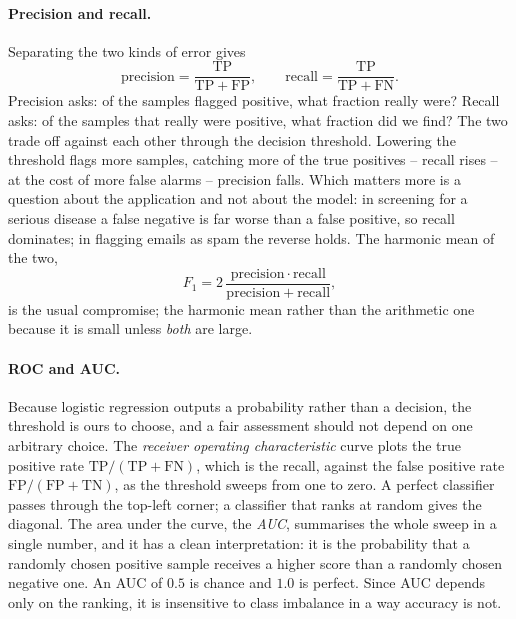 \paragraph{Precision and recall.}
Separating the two kinds of error gives
\begin{equation}
  \mathrm{precision} = \frac{\mathrm{TP}}{\mathrm{TP}+\mathrm{FP}},
  \qquad
  \mathrm{recall} = \frac{\mathrm{TP}}{\mathrm{TP}+\mathrm{FN}} .
  \label{eq:5-precisionrecall}
\end{equation}
Precision asks: of the samples flagged positive, what fraction really were?
Recall asks: of the samples that really were positive, what fraction did we
find?  The two trade off against each other through the decision threshold.
Lowering the threshold flags more samples, catching more of the true positives
-- recall rises -- at the cost of more false alarms -- precision falls.  Which
matters more is a question about the application and not about the model: in
screening for a serious disease a false negative is far worse than a false
positive, so recall dominates; in flagging emails as spam the reverse holds.
The harmonic mean of the two,
\begin{equation}
  F_1 = 2\,\frac{\mathrm{precision}\cdot\mathrm{recall}}
                {\mathrm{precision}+\mathrm{recall}},
  \label{eq:5-f1}
\end{equation}
is the usual compromise; the harmonic mean rather than the arithmetic one
because it is small unless \emph{both} are large.

\paragraph{ROC and AUC.}
Because logistic regression outputs a probability rather than a decision, the
threshold is ours to choose, and a fair assessment should not depend on one
arbitrary choice.  The \emph{receiver operating characteristic} curve plots
the true positive rate $\mathrm{TP}/(\mathrm{TP}+\mathrm{FN})$, which is the
recall, against the false positive rate
$\mathrm{FP}/(\mathrm{FP}+\mathrm{TN})$, as the threshold sweeps from one to
zero.  A perfect classifier passes through the top-left corner; a classifier
that ranks at random gives the diagonal.  The area under the curve, the
\emph{AUC}, summarises the whole sweep in a single number, and it has a clean
interpretation: it is the probability that a randomly chosen positive sample
receives a higher score than a randomly chosen negative one.  An AUC of
$0.5$ is chance and $1.0$ is perfect.  Since AUC depends only on the ranking,
it is insensitive to class imbalance in a way accuracy is not.

